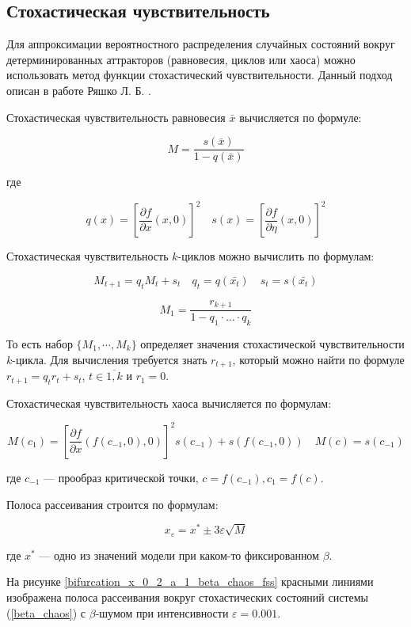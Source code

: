 \subsection{Стохастическая чувствительность}

    Для аппроксимации вероятностного распределения случайных состояний вокруг детерминированных аттракторов (равновесия, циклов или хаоса) можно использовать метод функции стохастический чувствительности. Данный подход описан в работе Ряшко Л. Б. \cite{Ryashko}.

    Стохастическая чувствительность равновесия \(\bar{x}\) вычисляется по формуле:

    \[
        M = \frac{s(\bar{x})}{1 - q(\bar{x})}
    \]

    где 

    \[
        q(x) = \left[\frac{\partial f}{\partial x}(x, 0)\right]^2 \quad s(x) = \left[\frac{\partial f}{\partial \eta}(x, 0)\right]^2
    \]

    Стохастическая чувствительность \(k\)-циклов можно вычислить по формулам:

    \[
        M_{t + 1} = q_t M_t + s_t \quad q_t = q(\bar{x_t}) \quad s_t = s(\bar{x_t})
    \]

    \[
        M_1 = \frac{r_{k + 1}}{1 - q_1 \cdot \ldots \cdot q_k}
    \]

    То есть набор \(\{M_1, \cdots, M_k\}\) определяет значения стохастической чувствительности \(k\)-цикла. Для вычисления требуется знать \(r_{t + 1}\), который можно найти по формуле \(r_{t + 1} = q_t r_t + s_t\), \(t \in \overline{1, k}\) и \(r_1 = 0\).

    Стохастическая чувствительность хаоса вычисляется по формулам:

    \[
        M(c_1) = \left[\frac{\partial f}{\partial x}(f(c_{-1}, 0), 0)\right]^2 s(c_{-1}) + s(f(c_{-1}, 0)) \quad M(c) = s(c_{-1})
    \]

    где \(c_{-1}\) --- прообраз критической точки, \(c = f(c_{-1}), c_1 = f(c)\).

    Полоса рассеивания строится по формулам: 

    \begin{equation}
        \label{scattering_band}
        x_\varepsilon = x^* \pm 3\varepsilon \sqrt{M}        
    \end{equation}

    где \(x^*\) --- одно из значений модели при каком-то фиксированном \(\beta\).
  
    На рисунке \ref{bifurcation_x_0_2_a_1_beta_chaos_fss} красными линиями изображена полоса рассеивания вокруг стохастических состояний системы (\ref{beta_chaos}) с \(\beta\)-шумом при интенсивности \(\varepsilon = 0.001\). 

